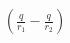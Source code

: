 \documentclass[preview]{standalone}
\begin{document}
\begin{align*}
\left( \frac{q}{r_1} - \frac{q}{r_2} \right)
\end{align*}
\end{document}
